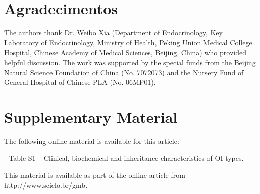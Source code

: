 \section*{Agradecimentos}
\par The authors thank Dr. Weibo Xia (Department of Endocrinology, Key Laboratory of Endocrinology, Ministry of Health, Peking Union Medical College Hospital, Chinese Academy of Medical Sciences, Beijing, China) who provided helpful discussion. The work was supported by the special funds from the Beijing Natural Science Foundation of China (No. 7072073) and the Nursery Fund of General Hospital of Chinese PLA (No. 06MP01).

\section*{Supplementary Material}
\par The following online material is available for this article: \par - Table S1 – Clinical, biochemical and inheritance characteristics of OI types.
\par This material is available as part of the online article from http://www.scielo.br/gmb.

